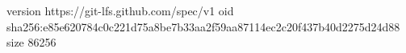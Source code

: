 version https://git-lfs.github.com/spec/v1
oid sha256:e85e620784c0c221d75a8be7b33aa2f59aa87114ec2c20f437b40d2275d24d88
size 86256
